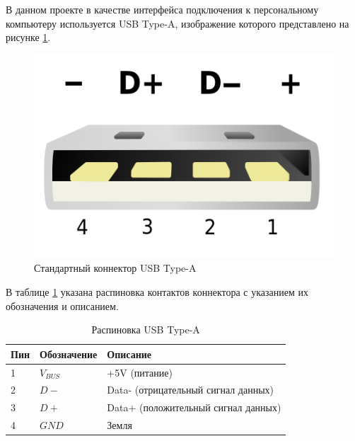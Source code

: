 В данном проекте в качестве интерфейса подключения к персональному компьютеру используется USB Type-A, изображение которого представлено на рисунке \ref{fig:usba}.

\begin{figure}[H]
    \centering
    \includegraphics[width=0.5\linewidth]{images/USB.png}
    \caption{Стандартный коннектор USB Type-A}
    \label{fig:usba}
\end{figure}

В таблице \ref{tab:usba-pins} указана распиновка контактов коннектора с указанием их обозначения и описанием.

\begin{table}[H]
    \caption{Распиновка USB Type-A}
    \label{tab:usba-pins}
    \begin{tabular}{|l|l|l|}
        \hline
        Пин & Обозначение & Описание                                \\ \hline
        1   & $V_{BUS}$   & +5V (питание)                           \\ \hline
        2   & $D-$          & Data- (отрицательный сигнал данных)   \\ \hline
        3   & $D+$          & Data+ (положительный сигнал данных)   \\ \hline
        4   & $GND$         & Земля                                 \\ \hline
\end{tabular}
\end{table}
